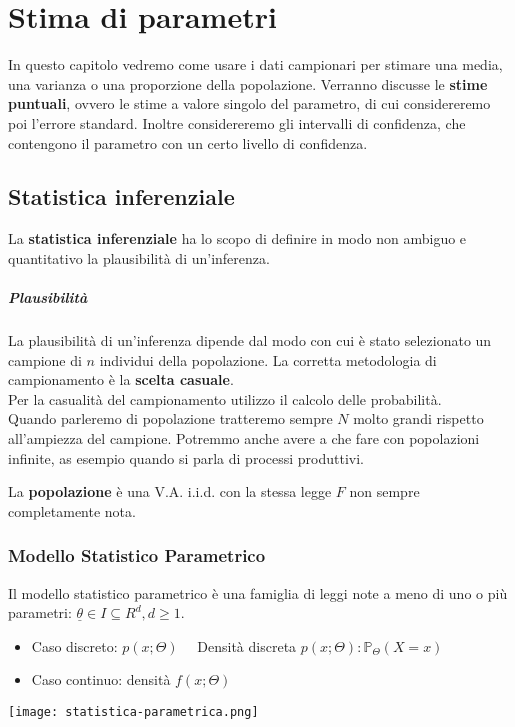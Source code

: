 \chapter{Stima di parametri}
In questo capitolo vedremo come usare i dati campionari per stimare una media,
una varianza o una proporzione della popolazione. 
Verranno discusse le \textbf{stime puntuali}, ovvero le stime a valore singolo del parametro,
di cui considereremo poi l'errore standard.
Inoltre considereremo gli intervalli di confidenza, che contengono il parametro
con un certo livello di confidenza.

\section{Statistica inferenziale}
La \textbf{statistica inferenziale} ha lo scopo di definire in modo non ambiguo e
quantitativo la plausibilità di un'inferenza.
\paragraph{Plausibilità}
La plausibilità di un'inferenza dipende dal modo con cui è stato selezionato
un campione di $n$ individui della popolazione.
La corretta metodologia di campionamento è la \textbf{scelta casuale}.
\\ Per la casualità del campionamento utilizzo il calcolo delle probabilità.
\\ Quando parleremo di popolazione tratteremo sempre $N$ molto grandi rispetto all'ampiezza del campione. 
Potremmo anche avere a che fare con popolazioni infinite, as esempio quando si parla di processi produttivi.

La \textbf{popolazione} è una V.A. i.i.d. con la stessa legge $F$ non sempre completamente nota.

\subsection{Modello Statistico Parametrico} 
Il modello statistico parametrico è una famiglia di leggi note a meno di uno o
più parametri: $\underline{\theta} \in I \subseteq R^d, d\geq 1$.
\begin{itemize}
    \item Caso discreto: $p(x; \Theta) \quad$ 
    Densità discreta $p(x;\Theta):\mathbb{P}_\Theta (X=x)$
    \item Caso continuo: densità $f(x; \Theta)$
\end{itemize}
\begin{center}
    \texttt{[image: statistica-parametrica.png]}
\end{center}

